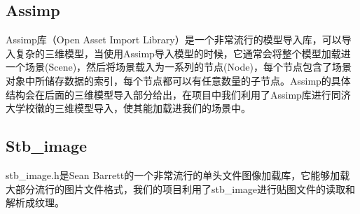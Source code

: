     \subsection{Assimp}
        \begin{spacing}{2.5}
        	Assimp库（Open Asset Import Library）是一个非常流行的模型导入库，可以导入复杂的三维模型，当使用Assimp导入模型的时候，它通常会将整个模型加载进一个场景(Scene)，然后将场景载入为一系列的节点(Node)，每个节点包含了场景对象中所储存数据的索引，每个节点都可以有任意数量的子节点。Assimp的具体结构会在后面的三维模型导入部分给出，在项目中我们利用了Assimp库进行同济大学校徽的三维模型导入，使其能加载进我们的场景中。
        \end{spacing}

    



    \subsection{Stb\_image}
            \begin{spacing}{2.5}
            	    stb\_image.h是Sean Barrett的一个非常流行的单头文件图像加载库，它能够加载大部分流行的图片文件格式，我们的项目利用了stb\_image进行贴图文件的读取和解析成纹理。
            \end{spacing}


    

